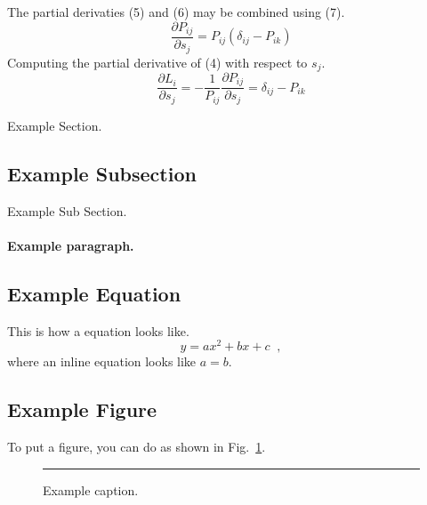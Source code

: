 \documentclass[12pt, letter]{article}
\begin{document}
The partial derivaties (5) and (6) may be combined using (7).
\begin{equation}
  \frac{\partial P_{ij}}{\partial s_{j}} = P_{ij} (\delta_{ij}  - P_{ik})
\end{equation}
Computing the partial derivative of (4) with respect to $s_j$.
\begin{equation}
  \frac{\partial L_i}{\partial s_j} = - \frac{1}{P_{ij}} \frac{\partial P_{ij}}{\partial s_{j}} = \delta_{ij} - P_{ik}
\end{equation}

\pagebreak

Example Section.

\subsection{Example Subsection}

Example Sub Section.

\paragraph{Example paragraph.}


\subsection{Example  Equation}

This is how a equation looks like.
\begin{equation}
  y = a x^2 + b x + c
  \;\;,
\end{equation}
where an inline equation looks like $a=b$.

\subsection{Example  Figure}

To put a figure, you can do as shown in Fig.~\ref{fig:eg}.
\begin{figure}
  \centering
  \rule{2cm}{2cm} %
  \caption{Example caption.}
  \label{fig:eg}
\end{figure}
\end{document}
